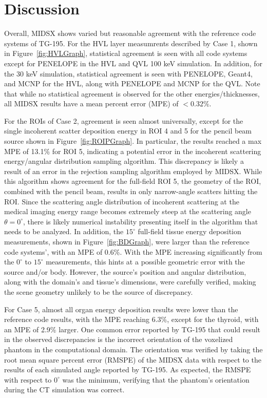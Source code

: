 \section{Discussion}
\par Overall, MIDSX shows varied but reasonable agreement with the reference code systems of TG-195. For the HVL layer measumrents described by Case 1, shown in Figure~\ref{fig:HVLGraph}, statistical agreement is seen with all code systems except for PENELOPE in the HVL and QVL 100 keV simulation. In addition, for the 30 keV simulation, statistical agreement is seen with PENELOPE, Geant4, and MCNP for the HVL, along with PENELOPE and MCNP for the QVL. Note that while no statistical agreement is observed for the other energies/thicknesses, all MIDSX results have a mean percent error (MPE) of $<0.32$\%.

\par For the ROIs of Case 2, agreement is seen almost universally, except for the single incoherent scatter deposition energy in ROI 4 and 5 for the pencil beam source shown in Figure~\ref{fig:ROIPGraph}. In particular, the results reached a max MPE of 13.1\% for ROI 5, indicating a potential error in the incoherent scattering energy/angular distribution sampling algorithm. This discrepancy is likely a result of an error in the rejection sampling algorithm employed by MIDSX. While this algorithm shows agreement for the full-field ROI 5, the geometry of the ROI, combined with the pencil beam, results in only narrow-angle scatters hitting the ROI. Since the scattering angle distribution of incoherent scattering at the medical imaging energy range becomes extremely steep at the scattering angle $\theta = 0^\circ$, there is likely numerical instability presenting itself in the algorithm that needs to be analyzed. In addition, the $15^\circ$ full-field tissue energy deposition measurements, shown in Figure~\ref{fig:BDGraph}, were larger than the reference code systems', with an MPE of 0.6\%. With the MPE increasing significantly from the $0^\circ$ to $15^\circ$ measurements, this hints at a possible geometric error with the source and/or body. However, the source's position and angular distribution, along with the domain's and tissue's dimensions, were carefully verified, making the scene geometry unlikely to be the source of discrepancy.

\par For Case 5, almost all organ energy deposition results were lower than the reference code results, with the MPE reaching 6.3\%, except for the thyroid, with an MPE of 2.9\% larger. One common error reported by TG-195 that could result in the observed discrepancies is the incorrect orientation of the voxelized phantom in the computational domain. The orientation was verified by taking the root mean square percent error (RMSPE) of the MIDSX data with respect to the results of each simulated angle reported by TG-195. As expected, the RMSPE with respect to $0^\circ$ was the minimum, verifying that the phantom's orientation during the CT simulation was correct.

